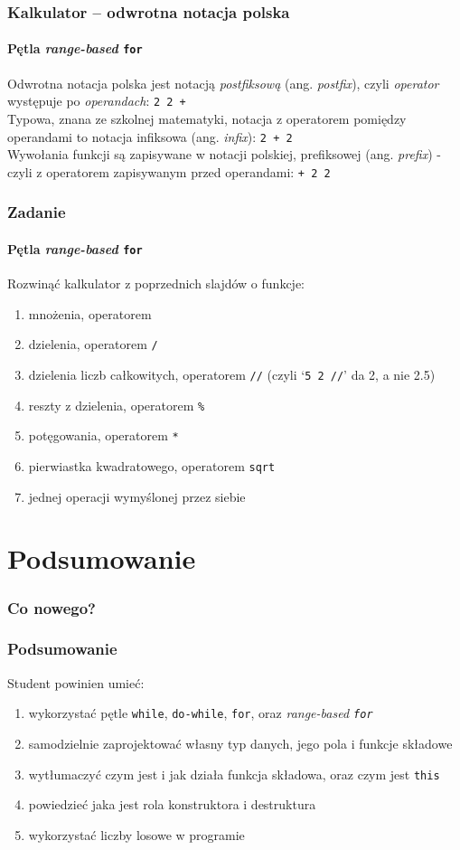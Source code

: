 \documentclass[aspectratio=169]{beamer}
\begin{document}
\begin{frame}[fragile]
    \frametitle{Kalkulator -- odwrotna notacja polska}
    \framesubtitle{Pętla \emph{range-based} {\tt for}}

    Odwrotna notacja polska jest notacją \emph{postfiksową} (ang.
    \emph{postfix}), czyli \emph{operator} występuje po \emph{operandach}:
    {\tt 2 2 +}\\
    Typowa, znana ze szkolnej matematyki, notacja z operatorem pomiędzy
    operandami to notacja infiksowa (ang. \emph{infix}): {\tt 2 + 2}\\
    Wywołania funkcji są zapisywane w notacji polskiej, prefiksowej (ang.
    \emph{prefix}) - czyli z operatorem zapisywanym przed operandami: {\tt + 2
    2}
\end{frame}

\begin{frame}[fragile]
    \frametitle{Zadanie}
    \framesubtitle{Pętla \emph{range-based} {\tt for}}
    \label{lecture_exercise_5}

    Rozwinąć kalkulator z poprzednich slajdów o funkcje:

    {\footnotesize
    \begin{enumerate}
        \item mnożenia, operatorem {\tt *}
        \item dzielenia, operatorem {\tt /}
        \item dzielenia liczb całkowitych, operatorem {\tt //} (czyli `{\tt 5 2
            //}' da 2, a nie 2.5)
        \item reszty z dzielenia, operatorem {\tt \%}
        \item potęgowania, operatorem {\tt **}
        \item pierwiastka kwadratowego, operatorem {\tt sqrt}
        \item jednej operacji wymyślonej przez siebie
    \end{enumerate}}
\end{frame}

\section{Podsumowanie}

\begin{frame}
    \frametitle{Co nowego?}
    \frametitle{Podsumowanie}

    Student powinien umieć:

    \begin{enumerate}
        \item wykorzystać pętle {\tt while}, {\tt do-while}, {\tt for}, oraz
            \emph{range-based {\tt for}}
        \item samodzielnie zaprojektować własny typ danych, jego pola i funkcje
            składowe
        \item wytłumaczyć czym jest i jak działa funkcja składowa, oraz czym
            jest {\tt this}
        \item powiedzieć jaka jest rola konstruktora i destruktura
        \item wykorzystać liczby losowe w programie
    \end{enumerate}
\end{frame}
\end{document}
